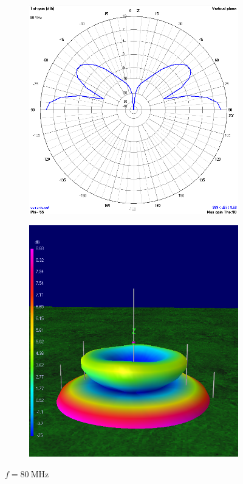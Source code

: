 \begin{figure}[H]
	\begin{subfigure}{0.5\textwidth}
		\includegraphics[scale=0.43]{imagenes/2D_80MHz_tierra.png}
	\end{subfigure}	
	\quad
	\begin{subfigure}{0.5\textwidth}
		\includegraphics[scale=0.43]{imagenes/3D_80MHz_tierra.png}
	\end{subfigure}
	\caption{$f=\SI{80}{\mega\hertz}$}
	\label{fig.radiacion_80M_tierra}
\end{figure}

